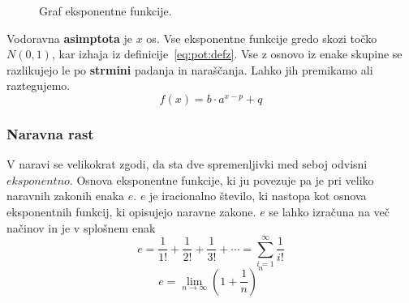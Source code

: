 \documentclass[a4paper,oneside,12pt,fleqn]{article}
\newcommand\krat\cdot
\newcommand{\beforecaptionskip}{\vspace{-12pt}}
\def\limi{\displaystyle\lim_{n\to\infty}} %
\numberwithin{equation}{section}
\begin{document}
\begin{figure}[ht]
  \begin{center}
  \end{center}
  \beforecaptionskip
  \caption{Graf eksponentne funkcije.}
  \label{fig:fun:eks:graf}
\end{figure}

Vodoravna \textbf{asimptota} je $x$ os. Vse eksponentne funkcije gredo skozi točko $N(0,1)$, kar
izhaja iz definicije~\eqref{eq:pot:defz}. Vse z osnovo iz enake skupine se razlikujejo le
po \textbf{strmini} padanja in naraščanja. Lahko jih premikamo ali raztegujemo.
\[ f(x) = b\krat a^{x-p} + q \]

\subsubsection{Naravna rast}
V naravi se velikokrat zgodi, da sta dve spremenljivki med seboj odvisni $eksponentno$. Osnova
eksponentne funkcije, ki ju povezuje pa je pri veliko naravnih zakonih enaka $e$. $e$ je iracionalno
število, ki nastopa kot osnova eksponentnih funkcij, ki opisujejo naravne zakone. $e$ se lahko
izračuna na več načinov in je v splošnem enak
\[ e = \frac{1}{1!} + \frac{1}{2!} + \frac{1}{3!} + \cdots = \sum_{i=1}^\infty\frac{1}{i!} \] 
\[ e = \limi\left( 1+\frac{1}{n} \right)^n \]
\end{document}
